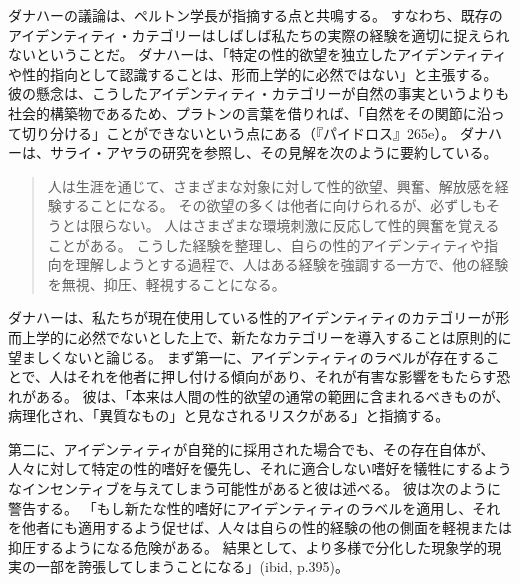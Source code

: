 \documentclass[paper=a4,book,openany]{jlreq}
\begin{document}
ダナハーの議論は、ペルトン学長が指摘する点と共鳴する。
すなわち、既存のアイデンティティ・カテゴリーはしばしば私たちの実際の経験を適切に捉えられないということだ。
ダナハーは、「特定の性的欲望を独立したアイデンティティや性的指向として認識することは、形而上学的に必然ではない」と主張する\citep[p.393]{danaher20:_sexual}。
彼の懸念は、こうしたアイデンティティ・カテゴリーが自然の事実というよりも社会的構築物であるため、プラトンの言葉を借りれば、「自然をその関節に沿って切り分ける」ことができないという点にある（『パイドロス』265e）。
ダナハーは、サライ・アヤラの研究\citep{ayala18:_sexual_orien_choic}を参照し、その見解を次のように要約している。

\begin{quote}
人は生涯を通じて、さまざまな対象に対して性的欲望、興奮、解放感を経験することになる。
その欲望の多くは他者に向けられるが、必ずしもそうとは限らない。
人はさまざまな環境刺激に反応して性的興奮を覚えることがある。
こうした経験を整理し、自らの性的アイデンティティや指向を理解しようとする過程で、人はある経験を強調する一方で、他の経験を無視、抑圧、軽視することになる。
\citep{danaher20:_sexual}
\end{quote}

ダナハーは、私たちが現在使用している性的アイデンティティのカテゴリーが形而上学的に必然でないとした上で、新たなカテゴリーを導入することは原則的に望ましくないと論じる。
まず第一に、アイデンティティのラベルが存在することで、人はそれを他者に押し付ける傾向があり、それが有害な影響をもたらす恐れがある。
彼は、「本来は人間の性的欲望の通常の範囲に含まれるべきものが、病理化され、「異質なもの」と見なされるリスクがある」と指摘する\citep[p.393]{danaher20:_sexual}。

第二に、アイデンティティが自発的に採用された場合でも、その存在自体が、人々に対して特定の性的嗜好を優先し、それに適合しない嗜好を犠牲にするようなインセンティブを与えてしまう可能性があると彼は述べる。
彼は次のように警告する。
「もし新たな性的嗜好にアイデンティティのラベルを適用し、それを他者にも適用するよう促せば、人々は自らの性的経験の他の側面を軽視または抑圧するようになる危険がある。
結果として、より多様で分化した現象学的現実の一部を誇張してしまうことになる」(ibid, p.395)。
\end{document}

